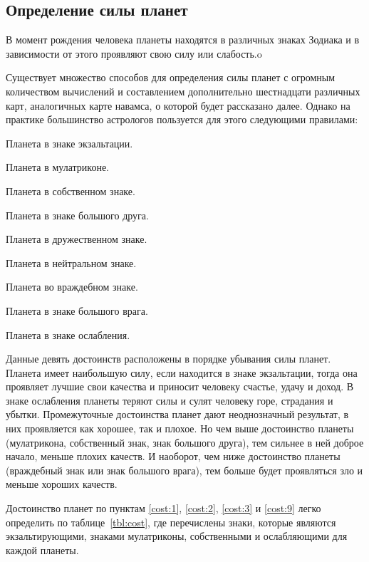 \subsection{Определение силы планет}

В момент рождения человека планеты находятся в различных знаках Зодиака и в зависимости от этого проявляют свою силу или слабость.o

Существует множество способов для определения силы планет с огромным количеством вычислений и составлением дополнительно шестнадцати различных карт, аналогичных карте навамса, о которой будет рассказано далее. Однако на практике большинство астрологов пользуется для этого следующими правилами:
\begin{myenum}[itemsep=0,parsep=0]
	\item Планета в знаке экзальтации.\label{cost:1}
	\item Планета в мулатриконе.\label{cost:2}
	\item Планета в собственном знаке.\label{cost:3}
	\item Планета в знаке большого друга.\label{cost:4}
	\item Планета в дружественном знаке.\label{cost:5}
	\item Планета в нейтральном знаке.\label{cost:6}
	\item Планета во враждебном знаке.\label{cost:7}
	\item Планета в знаке большого врага.\label{cost:8}
	\item Планета в знаке ослабления.\label{cost:9}
\end{myenum}

Данные девять достоинств расположены в порядке убывания силы планет. Планета имеет наибольшую силу, если находится в знаке экзальтации, тогда она проявляет лучшие свои качества и приносит человеку счастье, удачу и доход. В знаке ослабления планеты теряют силы и сулят человеку горе, страдания и убытки. Промежуточные достоинства планет дают неоднозначный результат, в них проявляется как хорошее, так и плохое. Но чем выше достоинство планеты (мулатрикона, собственный знак, знак большого друга), тем сильнее в ней доброе начало, меньше плохих качеств. И наоборот, чем ниже достоинство планеты (враждебный знак или знак большого врага), тем больше будет проявляться зло и меньше хороших качеств.

Достоинство планет по пунктам \ref{cost:1}, \ref{cost:2}, \ref{cost:3} и \ref{cost:9} легко определить по таблице~\ref{tbl:cost}, где перечислены знаки, которые являются экзальтирующими, знаками мулатриконы, собственными и ослабляющими для каждой планеты.

